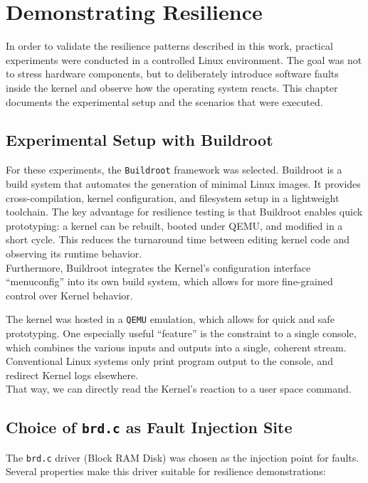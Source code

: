 \chapter{Demonstrating Resilience}

In order to validate the resilience patterns described in this work, practical experiments were conducted in a controlled Linux environment. The goal was not to stress hardware components, but to deliberately introduce software faults inside the kernel and observe how the operating system reacts. This chapter documents the experimental setup and the scenarios that were executed.

\section{Experimental Setup with Buildroot}

For these experiments, the \texttt{Buildroot}\cite{buildroot} framework was selected. Buildroot is a build system that automates the generation of minimal Linux images. It provides cross-compilation, kernel configuration, and filesystem setup in a lightweight toolchain. The key advantage for resilience testing is that Buildroot enables quick prototyping: a kernel can be rebuilt, booted under QEMU, and modified in a short cycle. This reduces the turnaround time between editing kernel code and observing its runtime behavior. \\
Furthermore, Buildroot integrates the Kernel's configuration interface \enquote{menuconfig} into its own build system, which allows for more fine-grained control over Kernel behavior. 

The kernel was hosted in a \texttt{QEMU} emulation, which allows for quick and safe prototyping. One especially useful \enquote{feature} is the constraint to a single console, which combines the various inputs and outputs into a single, coherent stream. Conventional Linux systems only print program output to the console, and redirect Kernel logs elsewhere. \\
That way, we can directly read the Kernel's reaction to a user space command.

\section{Choice of \texttt{brd.c} as Fault Injection Site}

The \texttt{brd.c} driver (Block RAM Disk) was chosen as the injection point for faults. Several properties make this driver suitable for resilience demonstrations:

